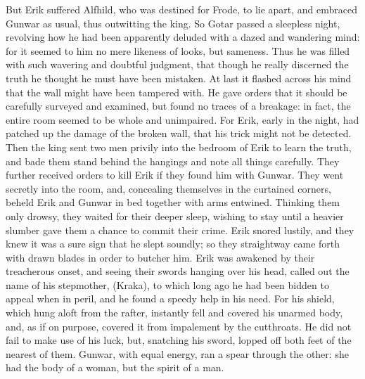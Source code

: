 \documentclass[10pt,a4paper]{report}
\begin{document}
But Erik suffered Alfhild, who was destined for Frode, to lie apart, and embraced Gunwar as usual, thus outwitting the king. So Gotar passed a sleepless night, revolving how he had been apparently deluded with a dazed and wandering mind: for it seemed to him no mere likeness of looks, but sameness. Thus he was filled with such wavering and doubtful judgment, that though he really discerned the truth he thought he must have been mistaken. At last it flashed across his mind that the wall might have been tampered with. He gave orders that it should be carefully surveyed and examined, but found no traces of a breakage: in fact, the entire room seemed to be whole and unimpaired. For Erik, early in the night, had patched up the damage of the broken wall, that his trick might not be detected. Then the king sent two men privily into the bedroom of Erik to learn the truth, and bade them stand behind the hangings and note all things carefully. They further received orders to kill Erik if they found him with Gunwar. They went secretly into the room, and, concealing themselves in the curtained corners, beheld Erik and Gunwar in bed together with arms entwined. Thinking them only drowsy, they waited for their deeper sleep, wishing to stay until a heavier slumber gave them a chance to commit their crime. Erik snored lustily, and they knew it was a sure sign that he slept soundly; so they straightway came forth with drawn blades in order to butcher him. Erik was awakened by their treacherous onset, and seeing their swords hanging over his head, called out the name of his stepmother, (Kraka), to which long ago he had been bidden to appeal when in peril, and he found a speedy help in his need. For his shield, which hung aloft from the rafter, instantly fell and covered his unarmed body, and, as if on purpose, covered it from impalement by the cutthroats. He did not fail to make use of his luck, but, snatching his sword, lopped off both feet of the nearest of them. Gunwar, with equal energy, ran a spear through the other: she had the body of a woman, but the spirit of a man.\\
\end{document}
